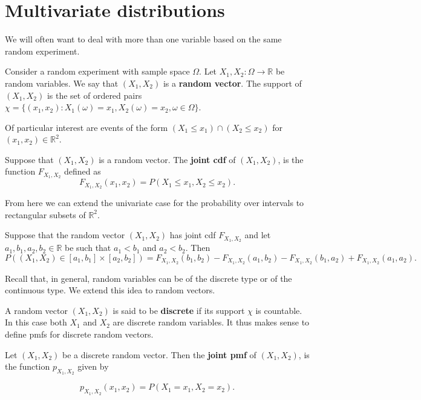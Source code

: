 \section{Multivariate distributions}

We will often want to deal with more than one variable based on the same random experiment.

\begin{definition}
	Consider a random experiment with sample space $\Omega$. Let $X_1,X_2:\Omega\to\mathbb R$ be random variables. We say that $(X_1,X_2)$ is a \textbf{random vector}. The support of $(X_1,X_2)$ is the set of ordered pairs $\chi=\{(x_1,x_2):X_1(\omega)=x_1,X_2(\omega)=x_2,\omega\in \Omega\}$.
\end{definition}

Of particular interest are events of the form $(X_1\leq x_1)\cap(X_2\leq x_2)$ for $(x_1,x_2)\in\mathbb R^2$.

\begin{definition}
	Suppose that $(X_1,X_2)$ is a random vector. The \textbf{joint cdf} of $(X_1,X_2)$, is the function $F_{X_1,X_2}$ defined as $$F_{X_1,X_2}(x_1,x_2)=P(X_1\leq x_1,X_2\leq x_2).$$
\end{definition}

From here we can extend the univariate case for the probability over intervals to rectangular subsets of $\mathbb R^2$.

\begin{theorem}
	Suppose that the random vector $(X_1,X_2)$ has joint cdf $F_{X_1,X_2}$ and let $a_1,b_1,a_2,b_2\in\mathbb R$ be such that $a_1<b_1$ and $a_2<b_2$. Then $$P\left((X_1,X_2)\in[a_1,b_1]\times[a_2,b_2]\right)=F_{X_1,X_2}(b_1,b_2)-F_{X_1,X_2}(a_1,b_2)-F_{X_1,X_2}(b_1,a_2)+F_{X_1,X_2}(a_1,a_2).$$
\end{theorem}

Recall that, in general, random variables can be of the discrete type or of the continuous type. We extend this idea to random vectors.

A random vector $(X_1,X_2)$ is said to be \textbf{discrete} if its support $\chi$ is countable. In this case both $X_1$ and $X_2$ are discrete random variables. It thus makes sense to define pmfs for discrete random vectors.

\begin{definition}
	Let $(X_1,X_2)$ be a discrete random vector. Then the \textbf{joint pmf} of $(X_1,X_2)$, is the function $p_{X_1,X_2}$ given by

	$$p_{X_1,X_2}(x_1,x_2)=P(X_1=x_1,X_2=x_2).$$
\end{definition}

